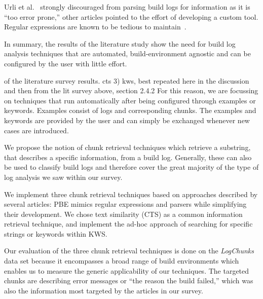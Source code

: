Urli et al.~\cite{urli2018design} strongly discouraged from parsing
build logs for information as it is ``too error prone,'' other
articles pointed to the effort of developing a custom tool.
Regular expressions are known to be tedious to
maintain~\cite{michael2019regexes}.


In summary, the results of the literature study show the need for
build log
analysis techniques that are automated, build-environment agnostic
and can be configured by the user with little effort.


of the literature survey results.
cts 3) kws, best repeated here in the discussion and then from the lit
survey above, section 2.4.2
For this reason, we are focussing on techniques that run automatically
after being configured through examples or keywords.
Examples consist of logs and corresponding chunks.
The examples and keywords are provided by the user and can simply be
exchanged whenever new cases are introduced.

We propose the notion of chunk retrieval techniques which retrieve
a substring, that describes a specific information, from a build log.
Generally, these can also be used to classify build logs and therefore
cover the great majority of the type of log analysis we saw within
our survey.

We implement three chunk retrieval techniques based on approaches
described by several articles:
PBE mimics regular expressions and parsers while simplifying
their development.
We chose text similarity (CTS) as a common information retrieval
technique, and implement the ad-hoc approach of
searching for specific strings or keywords within KWS\@.

Our evaluation of the three chunk retrieval techniques is done on the
\emph{LogChunks} data set because it encompasses a broad range of
build environments which enables us to measure the generic
applicability of our techniques.
The targeted chunks are describing error messages or
``the reason the build failed,'' which was also the information
most targeted by the articles in our survey.

